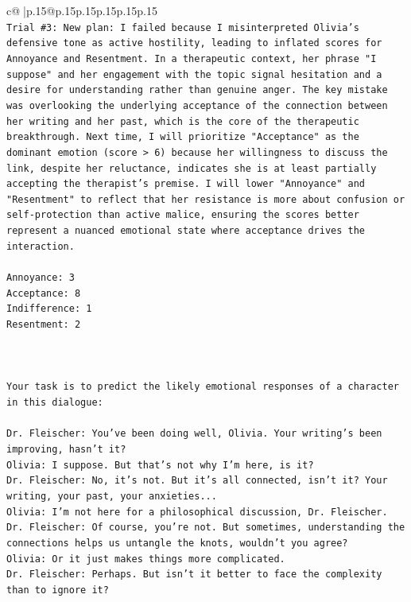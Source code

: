 \documentclass{article}
\begin{document}
{\begin{supertabular}{c@{$\;$}|p{.15\linewidth}@{}p{.15\linewidth}p{.15\linewidth}p{.15\linewidth}p{.15\linewidth}p{.15\linewidth}}
{{{\\ 
\texttt{Trial \#3: New plan: I failed because I misinterpreted Olivia's defensive tone as active hostility, leading to inflated scores for Annoyance and Resentment. In a therapeutic context, her phrase "I suppose" and her engagement with the topic signal hesitation and a desire for understanding rather than genuine anger. The key mistake was overlooking the underlying acceptance of the connection between her writing and her past, which is the core of the therapeutic breakthrough. Next time, I will prioritize "Acceptance" as the dominant emotion (score > 6) because her willingness to discuss the link, despite her reluctance, indicates she is at least partially accepting the therapist's premise. I will lower "Annoyance" and "Resentment" to reflect that her resistance is more about confusion or self{-}protection than active malice, ensuring the scores better represent a nuanced emotional state where acceptance drives the interaction.} \\
\\ 
\texttt{Annoyance: 3} \\
\texttt{Acceptance: 8} \\
\texttt{Indifference: 1} \\
\texttt{Resentment: 2} \\
\\ 
\\ 
\\ 
\texttt{Your task is to predict the likely emotional responses of a character in this dialogue:} \\
\\ 
\texttt{Dr. Fleischer: You've been doing well, Olivia. Your writing's been improving, hasn't it?} \\
\texttt{Olivia: I suppose. But that's not why I'm here, is it?} \\
\texttt{Dr. Fleischer: No, it's not. But it's all connected, isn't it? Your writing, your past, your anxieties...} \\
\texttt{Olivia: I'm not here for a philosophical discussion, Dr. Fleischer.} \\
\texttt{Dr. Fleischer: Of course, you're not. But sometimes, understanding the connections helps us untangle the knots, wouldn't you agree?} \\
\texttt{Olivia: Or it just makes things more complicated.} \\
\texttt{Dr. Fleischer: Perhaps. But isn't it better to face the complexity than to ignore it?} \\
}}}
\end{supertabular}}
\end{document}
